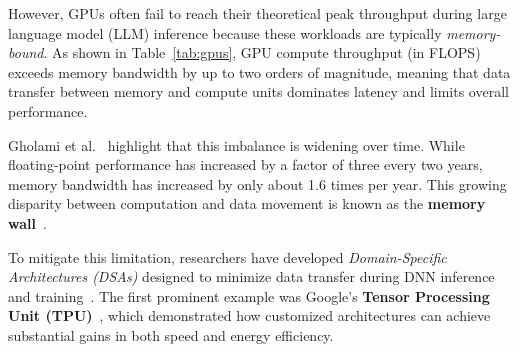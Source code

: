 However, GPUs often fail to reach their theoretical peak throughput during large language model (LLM) inference because these workloads are typically \textit{memory-bound}. As shown in Table~\ref{tab:gpus}, GPU compute throughput (in FLOPS) exceeds memory bandwidth by up to two orders of magnitude, meaning that data transfer between memory and compute units dominates latency and limits overall performance.

Gholami et al.~\cite{gholami2024ai} highlight that this imbalance is widening over time. While floating-point performance has increased by a factor of three every two years, memory bandwidth has increased by only about 1.6 times per year.
This growing disparity between computation and data movement is known as the \textbf{memory wall}~\cite{gholami2024ai}.

To mitigate this limitation, researchers have developed \textit{Domain-Specific Architectures (DSAs)} designed to minimize data transfer during DNN inference and training~\cite{Hooker2021, Dean2018}. The first prominent example was Google’s \textbf{Tensor Processing Unit (TPU)}~\cite{Jouppi2017}, which demonstrated how customized architectures can achieve substantial gains in both speed and energy efficiency.

\newpage